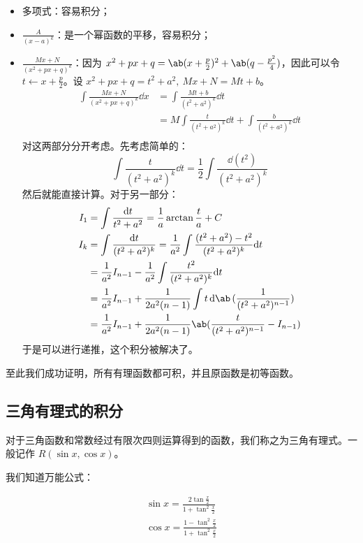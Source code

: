 \begin{itemize}
	\item 多项式：容易积分；
	\item $\frac{A}{(x - a)^k}$：是一个幂函数的平移，容易积分；
	\item $\frac{M x + N}{(x^2 + p x + q)^k}$：因为 $x^2 + p x + q = \ab(x + \frac{p}{2})^2 + \ab(q - \frac{p^2}{4})$，因此可以令 $t \gets x + \frac{p}{2}$。设 $x^2 + p x + q = t^2 + a^2,\ M x + N = M t + b$。
	$$
	\begin{aligned}
		\int \frac{M x + N}{(x^2 + p x + q)^k} \dd x & = \int \frac{M t + b}{(t^2 + a^2)^k} \dd t \\
		& = M \int \frac{t}{(t^2 + a^2)^k} \dd t + \int \frac{b}{(t^2 + a^2)^k} \dd t \\
	\end{aligned}
	$$
	对这两部分分开考虑。先考虑简单的：
	$$
	\int \frac{t}{(t^2 + a^2)^{k}} \dd{t} = \frac{1}{2} \int \frac{\dd(t^2)}{(t^2 + a^2)^{k}}
	$$
	然后就能直接计算。对于另一部分：
	$$
	\begin{aligned}
		I_1 & = \int \frac{\dd t}{t^2 + a^2} = \frac{1}{a} \arctan \frac{t}{a} + C \\
		I_k & = \int \frac{\dd t}{(t^2 + a^2)^k} = \frac{1}{a^2} \int \frac{(t^2 + a^2) - t^2}{(t^2 + a^2)^k} \dd t \\
		& = \frac{1}{a^2} I_{n-1} - \frac{1}{a^2} \int \frac{t^2}{(t^2 + a^2)^k} \dd t \\
		& = \frac{1}{a^2} I_{n-1} + \frac{1}{2 a^2 (n-1)} \int t \dd \ab(\frac{1}{(t^2 + a^2)^{n-1}}) \\
		& = \frac{1}{a^2} I_{n-1} + \frac{1}{2 a^2 (n-1)} \ab(\frac{t}{(t^2 + a^2)^{n-1}} - I_{n-1}) \\
	\end{aligned}
	$$
	于是可以进行递推，这个积分被解决了。
\end{itemize}

至此我们成功证明，所有有理函数都可积，并且原函数是初等函数。

\subsection{三角有理式的积分}

对于三角函数和常数经过有限次四则运算得到的函数，我们称之为三角有理式。一般记作 $R(\sin x, \cos x)$。

我们知道万能公式：

$$
\begin{gathered}
	\sin x = \frac{2 \tan \frac{x}{2}}{1 + \tan^2 \frac{x}{2}} \\
	\cos x = \frac{1 - \tan^2 \frac{x}{2}}{1 + \tan^2 \frac{x}{2}}	
\end{gathered}
$$

